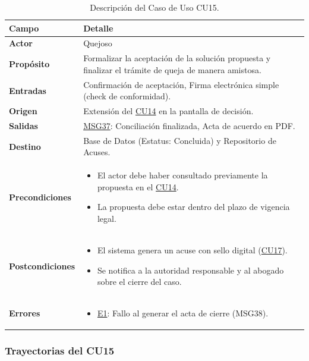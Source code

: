 \begin{appendices}
\begin{table}[htbp]
\centering
\small
{}
\begin{tabular}{|p{3.5cm}|p{10.5cm}|}
\hline
\rowcolor[HTML]{EFEFEF} 
\textbf{Campo} & \textbf{Detalle} \\ \hline
\textbf{Actor} & Quejoso \\ \hline
\textbf{Propósito} & Formalizar la aceptación de la solución propuesta y finalizar el trámite de queja de manera amistosa. \\ \hline
\textbf{Entradas} & Confirmación de aceptación, Firma electrónica simple (check de conformidad). \\ \hline
\textbf{Origen} & Extensión del \hyperlink{anexo:casos_uso}{CU14} en la pantalla de decisión. \\ \hline
\textbf{Salidas} & \hyperlink{msg:MSG37}{MSG37}: Conciliación finalizada, Acta de acuerdo en PDF. \\ \hline
\textbf{Destino} & Base de Datos (Estatus: Concluida) y Repositorio de Acuses. \\ \hline
\textbf{Precondiciones} & 
\begin{itemize}[nosep, leftmargin=*]
    \item El actor debe haber consultado previamente la propuesta en el \hyperlink{anexo:casos_uso}{CU14}.
    \item La propuesta debe estar dentro del plazo de vigencia legal.
\end{itemize} \\ \hline
\textbf{Postcondiciones} & 
\begin{itemize}[nosep, leftmargin=*]
    \item El sistema genera un acuse con sello digital (\hyperlink{anexo:casos_uso}{CU17}).
    \item Se notifica a la autoridad responsable y al abogado sobre el cierre del caso.
\end{itemize} \\ \hline
\textbf{Errores} & 
\begin{itemize}[nosep, leftmargin=*]
    \item \hyperlink{err:E20}{E1}: Fallo al generar el acta de cierre (MSG38).
\end{itemize} \\ \hline
\end{tabular}
\caption{Descripción del Caso de Uso CU15.}
\label{tab:cu15_especificacion}
\end{table}

\subsubsection{Trayectorias del CU15}


\end{appendices}
